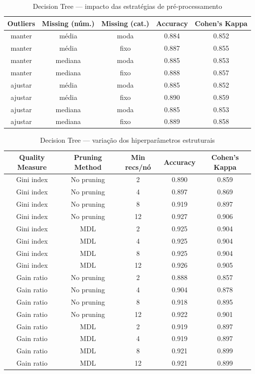 \documentclass[11pt,a4paper]{article}
\begin{document}
\begin{table}[H]
    \centering
    \caption{Decision Tree --- impacto das estratégias de pré-processamento}
    \label{tab:dt_preprocessamento}
    \begin{tabular}{ccccc}
    \toprule
    Outliers & Missing (núm.) & Missing (cat.) & Accuracy & Cohen's Kappa \\
    \midrule
    manter & média & moda & 0.884 & 0.852 \\
    manter & média & fixo & 0.887 & 0.855 \\
    manter & mediana & moda & 0.885 & 0.853 \\
    manter & mediana & fixo & 0.888 & 0.857 \\
    ajustar & média & moda & 0.885 & 0.852 \\
    ajustar & média & fixo & 0.890 & 0.859 \\
    ajustar & mediana & moda & 0.885 & 0.853 \\
    ajustar & mediana & fixo & 0.889 & 0.858 \\
    \bottomrule
    \end{tabular}
\end{table}

\begin{table}[H]
    \centering
    \caption{Decision Tree --- variação dos hiperparâmetros estruturais}
    \label{tab:dt_hiperparametros}
    \begin{tabular}{ccccc}
    \toprule
    Quality Measure & Pruning Method & Min recs/nó & Accuracy & Cohen's Kappa \\
    \midrule
    Gini index & No pruning & 2 & 0.890 & 0.859 \\
    Gini index & No pruning & 4 & 0.897 & 0.869 \\
    Gini index & No pruning & 8 & 0.919 & 0.897 \\
    Gini index & No pruning & 12 & 0.927 & 0.906 \\
    Gini index & MDL & 2 & 0.925 & 0.904 \\
    Gini index & MDL & 4 & 0.925 & 0.904 \\
    Gini index & MDL & 8 & 0.925 & 0.904 \\
    Gini index & MDL & 12 & 0.926 & 0.905 \\
    Gain ratio & No pruning & 2 & 0.888 & 0.857 \\
    Gain ratio & No pruning & 4 & 0.904 & 0.878 \\
    Gain ratio & No pruning & 8 & 0.918 & 0.895 \\
    Gain ratio & No pruning & 12 & 0.922 & 0.901 \\
    Gain ratio & MDL & 2 & 0.919 & 0.897 \\
    Gain ratio & MDL & 4 & 0.919 & 0.897 \\
    Gain ratio & MDL & 8 & 0.921 & 0.899 \\
    Gain ratio & MDL & 12 & 0.921 & 0.899 \\
    \bottomrule
    \end{tabular}
\end{table}
\end{document}
